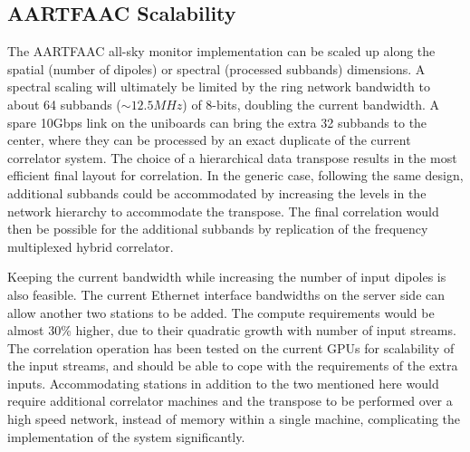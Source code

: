 \documentclass{ws-jai}
\begin{document}
\subsection   {AARTFAAC  Scalability}
   The  AARTFAAC   all-sky  monitor
implementation  can be  scaled  up  along the  spatial  (number  of dipoles)  or
spectral (processed subbands) dimensions. A  spectral scaling will ultimately be
limited by the  ring network bandwidth to about 64  subbands ($\sim12.5 MHz$) of
8-bits, doubling the current bandwidth. A spare 10Gbps link on the uniboards can
bring the  extra 32 subbands to  the center, where  they can be processed  by an
exact duplicate of the current correlator  system.  The choice of a hierarchical
data transpose results  in the most efficient final layout  for correlation.  In
the  generic case,  following  the  same design,  additional  subbands could  be
accommodated by  increasing the levels  in the network hierarchy  to accommodate
the transpose.  The final correlation would  then be possible for the additional
subbands by replication of the frequency multiplexed hybrid correlator.

Keeping the  current bandwidth while increasing  the number of input  dipoles is
also feasible. The current Ethernet interface  bandwidths on the server side can
allow  another two  stations to  be added.   The compute  requirements would  be
almost 30\% higher, due to their  quadratic growth with number of input streams.
The correlation operation has been tested on the current GPUs for scalability of
the input streams, and should be able to cope with the requirements of the extra
inputs.   Accommodating stations  in addition  to the  two mentioned  here would
require additional correlator machines and the  transpose to be performed over a
high speed network, instead of memory  within a single machine, complicating the
implementation of the system significantly.\\
\end{document}
